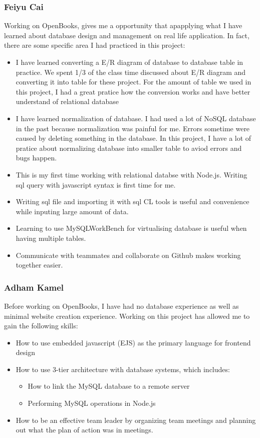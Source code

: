\documentclass[letter, 12pt, titlepage]{article}
\begin{document}
\subsubsection{Feiyu Cai}
Working on OpenBooks, gives me a opportunity that apapplying what I have learned about database design and management on real life application. In fact, there are some specific area I had practiced in this project: 
\begin{itemize}
	\item I have learned converting a E/R diagram of database to database table in practice. We spent 1/3 of the class time discussed about E/R diagram and converting it into table for these project. For the amount of table we used in this project, I had a great pratice how the conversion works and have better understand of relational database
	\item I have learned normalization of database. I had used a lot of NoSQL database in the past because normalization was painful for me. Errors sometime were caused by deleting something in the database. In this project, I have a lot of pratice about normalizing database into smaller table to aviod errors and bugs happen.
	\item This is my first time working with relational databse with Node.js. Writing sql query with javascript syntax is first time for me. 
	\item Writing sql file and importing it with sql CL tools is useful and convenience while inputing large amount of data.
	\item Learning to use MySQLWorkBench for virtualising database is useful when having multiple tables.
	\item Communicate with teammates and collaborate on Github makes working together easier.  
\end{itemize}
\subsubsection{Adham Kamel}
Before working on OpenBooks, I have had no database experience as well as minimal website creation experience. Working on this project has allowed me to gain the following skills:
\begin{itemize}
	\item How to use embedded javascript (EJS) as the primary language for frontend design
	\item How to use 3-tier architecture with database systems, which includes:
		\begin{itemize}
			\item How to link the MySQL database to a remote server
			\item Performing MySQL operations in Node.js
		\end{itemize}
	\item How to be an effective team leader by organizing team meetings and planning out what the plan of action was in meetings.
\end{itemize}
\end{document}
